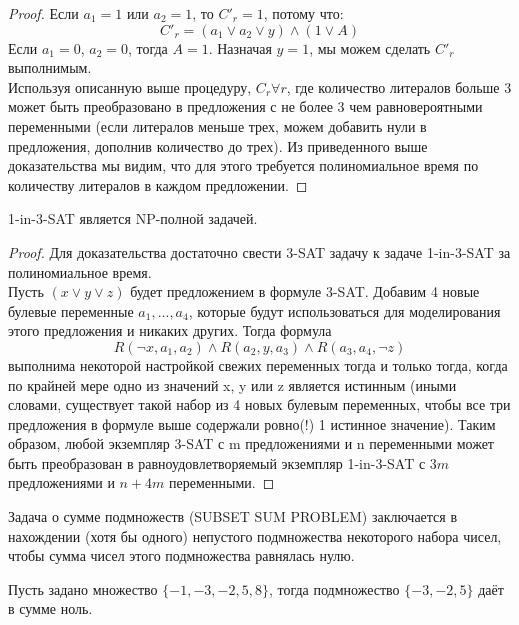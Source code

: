 \begin{proof}
        Если $a_1 = 1$ или $a_2 = 1$, то $C'_r = 1$, потому что:
        $$C'_r = (a_1 \vee a_2 \vee y) \wedge (1 \vee A) $$
        Если $a_1 = 0$, $a_2 = 0$, тогда $A = 1$. Назначая $y = 1$, мы можем сделать $C'_r$ выполнимым.\\
        Используя описанную выше процедуру, $C_r \forall r$, где количество литералов больше 3 может быть преобразовано в предложения с не более 3 чем равновероятными переменными (если литералов меньше трех, можем добавить нули в предложения, дополнив количество до трех). Из приведенного выше доказательства мы видим, что для этого требуется полиномиальное время по количеству литералов в каждом предложении.
    \end{proof}
    
    \begin{Thm}
        1-in-3-SAT является NP-полной задачей.
    \end{Thm}
    
    \begin{proof}
        Для доказательства достаточно свести 3-SAT задачу к задаче 1-in-3-SAT за полиномиальное время.\\
        Пусть $(x \vee y \vee z)$ будет предложением в формуле 3-SAT. Добавим 4 новые булевые переменные $a_1, ..., a_4$, которые будут использоваться для моделирования этого предложения и никаких других. Тогда формула $$R(\neg x,a_1, a_2) \wedge R(a_2, y, a_3) \wedge R(a_3, a_4, \neg z)$$ выполнима некоторой настройкой свежих переменных тогда и только тогда, когда по крайней мере одно из значений x, y или z является истинным (иными словами, существует такой набор из 4 новых булевым переменных, чтобы все три предложения в формуле выше содержали ровно(!) 1 истинное значение). Таким образом, любой экземпляр 3-SAT с m предложениями и n переменными может быть преобразован в равноудовлетворяемый экземпляр 1-in-3-SAT с $3m$ предложениями и $n + 4m$ переменными.
    \end{proof}
    
    \begin{Def}
        Задача о сумме подмножеств (SUBSET SUM PROBLEM) заключается в нахождении (хотя бы одного) непустого подмножества некоторого набора чисел, чтобы сумма чисел этого подмножества равнялась нулю.
    \end{Def}
    
    \begin{Example}
        Пусть задано множество $\{-1, -3, -2, 5, 8\}$, тогда подмножество $\{-3, -2, 5\}$ даёт в сумме ноль.
    \end{Example}
    
